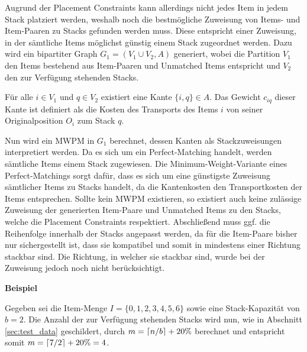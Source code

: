 Augrund der Placement Constraints kann allerdings nicht jedes Item in jedem Stack platziert werden, weshalb noch die bestmögliche Zuweisung von
Items- und Item-Paaren zu Stacks gefunden werden muss. Diese entspricht einer Zuweisung, in der sämtliche Items möglichst günstig einem Stack zugeordnet werden. Dazu wird ein bipartiter Graph $G_1 = (V_1 \cup V_2, A)$ generiert, wobei die Partition $V_1$ den Items bestehend aus Item-Paaren und Unmatched Items entspricht und $V_2$ den zur Verfügung stehenden Stacks.

Für alle $i \in V_1$ und $q \in V_2$ existiert eine Kante $\{i, q\} \in A$. Das Gewicht $c_{iq}$ dieser Kante ist definiert als die Kosten
des Transports des Items $i$ von seiner Originalposition $O_i$ zum Stack $q$.

Nun wird ein \textsc{MWPM} in $G_1$ berechnet, dessen Kanten als Stackzuweisungen interpretiert werden.
Da es sich um ein Perfect-Matching handelt, werden sämtliche Items einem Stack zugewiesen. Die Minimum-Weight-Variante eines
Perfect-Matchings sorgt dafür, dass es sich um eine günstigste Zuweisung sämtlicher Items zu Stacks handelt, da die Kantenkosten
den Transportkosten der Items entsprechen. Sollte kein \textsc{MWPM} existieren, so existiert auch keine zulässige Zuweisung
der generierten Item-Paare und Unmatched Items zu den Stacks, welche die Placement Constraints respektiert.
Abschließend muss ggf. die Reihenfolge innerhalb der Stacks angepasst werden, da für die Item-Paare bisher nur sichergestellt ist,
dass sie kompatibel und somit in mindestens einer Richtung stackbar sind. Die Richtung, in welcher sie stackbar sind, wurde bei der Zuweisung
jedoch noch nicht berücksichtigt.

\pagebreak

\textbf{Beispiel}

Gegeben sei die Item-Menge $I = \{0, 1, 2, 3, 4, 5, 6\}$ sowie eine Stack-Kapazität von $b = 2$.
Die Anzahl der zur Verfügung stehenden Stacks wird nun, wie in Abschnitt \ref{sec:test_data} geschildert,
durch $m = \lceil n / b\rceil + 20 \%$ berechnet und entspricht somit $m = \lceil7 / 2\rceil + 20 \% = 4$.

